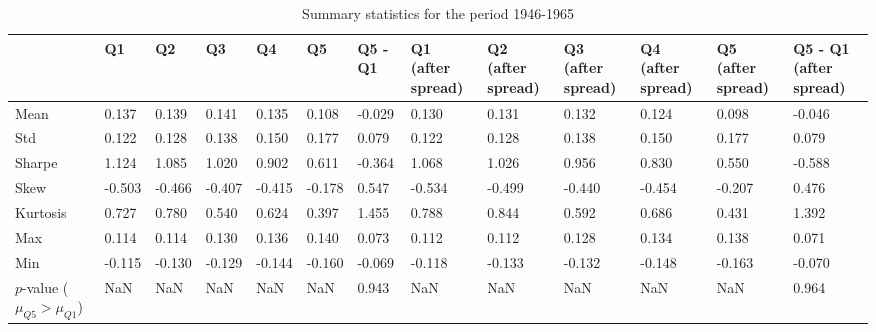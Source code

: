 \begin{table}
\caption{Summary statistics for the period 1946-1965}
\label{tab:summary_1946_1965}
\begin{tabular}{lllllllllllll}
\toprule
 & Q1 & Q2 & Q3 & Q4 & Q5 & Q5 - Q1 & Q1 (after spread) & Q2 (after spread) & Q3 (after spread) & Q4 (after spread) & Q5 (after spread) & Q5 - Q1 (after spread) \\
\midrule
Mean & 0.137 & 0.139 & 0.141 & 0.135 & 0.108 & -0.029 & 0.130 & 0.131 & 0.132 & 0.124 & 0.098 & -0.046 \\
Std & 0.122 & 0.128 & 0.138 & 0.150 & 0.177 & 0.079 & 0.122 & 0.128 & 0.138 & 0.150 & 0.177 & 0.079 \\
Sharpe & 1.124 & 1.085 & 1.020 & 0.902 & 0.611 & -0.364 & 1.068 & 1.026 & 0.956 & 0.830 & 0.550 & -0.588 \\
Skew & -0.503 & -0.466 & -0.407 & -0.415 & -0.178 & 0.547 & -0.534 & -0.499 & -0.440 & -0.454 & -0.207 & 0.476 \\
Kurtosis & 0.727 & 0.780 & 0.540 & 0.624 & 0.397 & 1.455 & 0.788 & 0.844 & 0.592 & 0.686 & 0.431 & 1.392 \\
Max & 0.114 & 0.114 & 0.130 & 0.136 & 0.140 & 0.073 & 0.112 & 0.112 & 0.128 & 0.134 & 0.138 & 0.071 \\
Min & -0.115 & -0.130 & -0.129 & -0.144 & -0.160 & -0.069 & -0.118 & -0.133 & -0.132 & -0.148 & -0.163 & -0.070 \\
$p$-value ($\mu_{Q5} > \mu_{Q1}$) & NaN & NaN & NaN & NaN & NaN & 0.943 & NaN & NaN & NaN & NaN & NaN & 0.964 \\
\bottomrule
\end{tabular}
\end{table}
